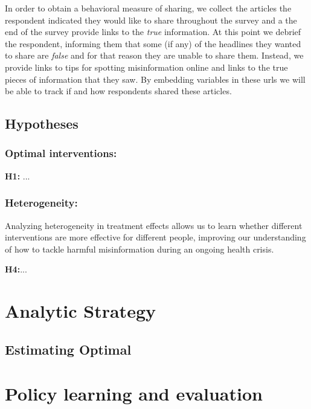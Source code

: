 \documentclass[letterpaper, 12pt, parskip=full, headsepline]{scrartcl}
\begin{document}
In order to obtain a behavioral measure of sharing, we collect the articles the respondent indicated they would like to share throughout the survey and a the end of the survey provide links to the \textit{true} information. At this point we debrief the respondent, informing them that some (if any) of the headlines they wanted to share are \textit{false} and for that reason they are unable to share them. Instead, we provide links to tips for spotting misinformation online and links to the true pieces of information that they saw. By embedding variables in these urls we will be able to track if and how respondents shared these articles.


\subsection{Hypotheses}
\subsubsection{Optimal interventions:}
\textbf{H1:} ...

\subsubsection{Heterogeneity:}
Analyzing heterogeneity in treatment effects allows us to learn whether different interventions are more effective for different people, improving our understanding of how to tackle harmful misinformation during an ongoing health crisis.
 
\textbf{H4:}...

\section{Analytic Strategy}
\subsection{Estimating Optimal}




\section{Policy learning and evaluation}
\end{document}
